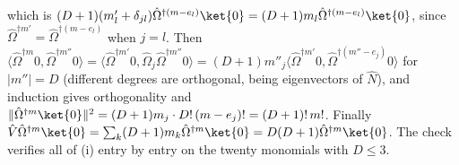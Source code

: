 which is $(D + 1)(m'_{l} + \delta_{jl})\hat\Omega^{\dagger(m - e_{l})}\ket{0} = (D + 1)m_{l}\hat\Omega^{\dagger(m - e_{l})}\ket{0}$, since $\hat\Omega^{\dagger m'} = \hat\Omega^{\dagger(m - e_{l})}$ when $j = l$. Then $\langle\hat\Omega^{\dagger m}0, \hat\Omega^{\dagger m''}0\rangle = \langle\hat\Omega^{\dagger m'}0, \hat\Omega_{j}\hat\Omega^{\dagger m''}0\rangle = (D + 1)m''_{j}\langle\hat\Omega^{\dagger m'}0, \hat\Omega^{\dagger(m'' - e_{j})}0\rangle$ for $|m''| = D$ (different degrees are orthogonal, being eigenvectors of $\hat{N}$), and induction gives orthogonality and $\|\hat\Omega^{\dagger m}\ket{0}\|^{2} = (D + 1)m_{j}\cdot D!\,(m - e_{j})! = (D + 1)!\,m!$. Finally $\hat{V}\hat\Omega^{\dagger m}\ket{0} = \sum_{k}(D + 1)m_{k}\hat\Omega^{\dagger m}\ket{0} = D(D + 1)\hat\Omega^{\dagger m}\ket{0}$. The check verifies all of (i) entry by entry on the twenty monomials with $D \le 3$.

